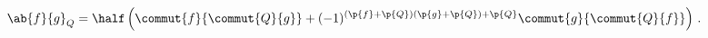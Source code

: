 \begin{equation}
\ab{f}{g}_Q=\half
\left(
\commut{f}{\commut{Q}{g}}+(-1)^{(\p{f}+\p{Q})(\p{g}+\p{Q})+\p{Q}}
\commut{g}{\commut{Q}{f}}
\right)\,.
\end{equation}

